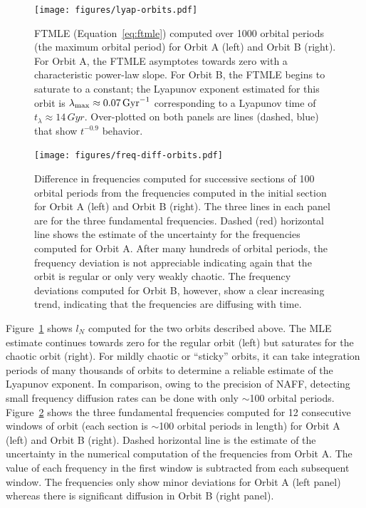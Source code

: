 \documentclass[letterpaper,12pt,preprint]{aastex}
\begin{document}
\begin{figure}[!h]
\begin{center}
\texttt{[image: figures/lyap-orbits.pdf]}
\caption{ FTMLE (Equation~\ref{eq:ftmle}) computed over 1000 orbital periods (the maximum orbital period) for Orbit A (left) and Orbit B (right). For Orbit A, the FTMLE asymptotes towards zero with a characteristic power-law slope. For Orbit B, the FTMLE begins to saturate to a constant; the Lyapunov exponent estimated for this orbit is $\lambda_{\rm max} \approx 0.07 \, {\rm Gyr}^{-1}$ corresponding to a Lyapunov time of $t_\lambda \approx 14 \, {Gyr}$. Over-plotted on both panels are lines (dashed, blue) that show $t^{-0.9}$ behavior.} \label{fig:lyap-orbits}
\end{center}
\end{figure}
\begin{figure}[!h]
\begin{center}
\texttt{[image: figures/freq-diff-orbits.pdf]}
\caption{ Difference in frequencies computed for successive sections of 100 orbital periods from the frequencies computed in the initial section for Orbit A (left) and Orbit B (right). The three lines in each panel are for the three fundamental frequencies. Dashed (red) horizontal line shows the estimate of the uncertainty for the frequencies computed for Orbit A. After many hundreds of orbital periods, the frequency deviation is not appreciable indicating again that the orbit is regular or only very weakly chaotic. The frequency deviations computed for Orbit B, however, show a clear increasing trend, indicating that the frequencies are diffusing with time. } \label{fig:fdiff-orbits} %
\end{center}
\end{figure}

Figure~\ref{fig:lyap-orbits} shows $l_N$ computed for the two orbits described above. The MLE estimate continues towards zero for the regular orbit (left) but saturates for the chaotic orbit (right). For mildly chaotic or ``sticky'' orbits, it can take integration periods of many thousands of orbits to determine a reliable estimate of the Lyapunov exponent. In comparison, owing to the precision of NAFF, detecting small frequency diffusion rates can be done with only $\sim$100 orbital periods. Figure~\ref{fig:fdiff-orbits} shows the three fundamental frequencies computed for 12 consecutive windows of orbit (each section is $\sim$100 orbital periods in length) for Orbit A (left) and Orbit B (right). Dashed horizontal line is the estimate of the uncertainty in the numerical computation of the frequencies from Orbit A. The value of each frequency in the first window is subtracted from each subsequent window. The frequencies only show minor deviations for Orbit A (left panel) whereas there is significant diffusion in Orbit B (right panel).
\end{document}
